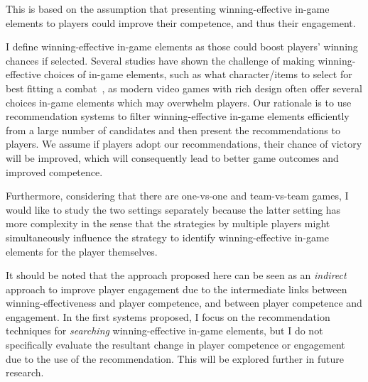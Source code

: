 This is based on the assumption that presenting winning-effective in-game elements to players could improve their competence, and thus their engagement. 

I define winning-effective in-game elements as those could boost players' winning chances if selected. Several studies have shown the challenge of making winning-effective choices of in-game elements, such as what character/items to select for best fitting a combat~\cite{looi2018recommender,summerville2017reco,hanke2017reco}, as modern video games with rich design often offer several choices in-game elements which may overwhelm players. Our rationale is to use recommendation systems to filter winning-effective in-game elements efficiently from a large number of candidates and then present the recommendations to players. We assume if players adopt our recommendations, their chance of victory will be improved, which will consequently lead to better game outcomes and improved competence. 

Furthermore, considering that there are one-vs-one and team-vs-team games, I would like to study the two settings separately because the latter setting has more complexity in the sense that the strategies by multiple players might simultaneously influence the strategy to identify winning-effective in-game elements for the player themselves. 




 

It should be noted that the approach proposed here can be seen as an \textit{indirect} approach to improve player engagement due to the intermediate links between winning-effectiveness and player competence, and between player competence and engagement. In the first systems proposed, I focus on the recommendation techniques for \textit{searching} winning-effective in-game elements, but I do not specifically evaluate the resultant change in player competence or engagement due to the use of the recommendation. This will be explored further in future research.


